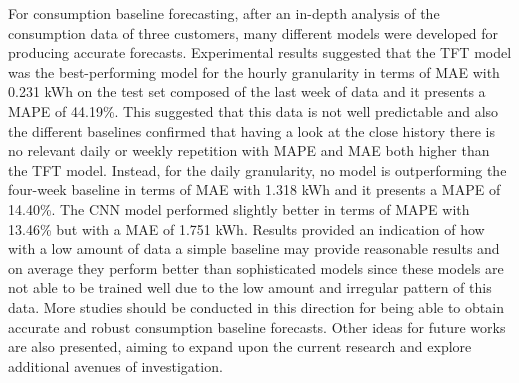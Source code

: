 For consumption baseline forecasting, after an in-depth analysis of the consumption data of three customers, many different models were developed for producing accurate forecasts.
Experimental results suggested that the TFT model was the best-performing model for the hourly granularity in terms of MAE with 0.231 kWh on the test set composed of the last week of data and it presents a MAPE of 44.19\%.
This suggested that this data is not well predictable and also the different baselines confirmed that having a look at the close history there is no relevant daily or weekly repetition with MAPE and MAE both higher than the TFT model.
Instead, for the daily granularity, no model is outperforming the four-week baseline in terms of MAE with 1.318 kWh and it presents a MAPE of 14.40\%.
The CNN model performed slightly better in terms of MAPE with 13.46\% but with a MAE of 1.751 kWh.
Results provided an indication of how with a low amount of data a simple baseline may provide reasonable results and on average they perform better than sophisticated models since these models are not able to be trained well due to the low amount and irregular pattern of this data.
More studies should be conducted in this direction for being able to obtain accurate and robust consumption baseline forecasts.
Other ideas for future works are also presented, aiming to expand upon the current research and explore additional avenues of investigation.
